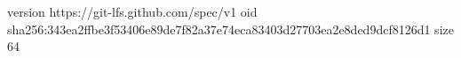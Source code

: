 version https://git-lfs.github.com/spec/v1
oid sha256:343ea2ffbe3f53406e89de7f82a37e74eca83403d27703ea2e8ded9dcf8126d1
size 64
